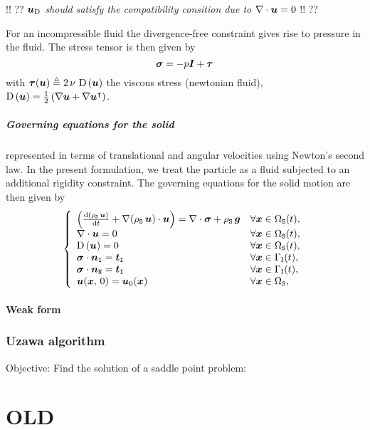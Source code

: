 \documentclass[10pt,a4paper]{article}
\begin{document}
!! ?? \emph{$\boldsymbol{u}_{\mathrm{D}}$ should satisfy the compatibility consition due to $\nabla\cdot \boldsymbol{u} =0$} !! ??

For an incompressible fluid the divergence-free constraint gives rise to pressure in the fluid. The stress tensor is then given by
 \begin{equation}
 \label{eq:stress_tensor}
 \boldsymbol{\sigma} = -p\boldsymbol{I} + \boldsymbol{\tau}
 \end{equation}
%
with $\boldsymbol{\tau}(\boldsymbol{u}) \triangleq 2\,\nu\, \operatorname{D}\left( \boldsymbol{u}\right)$ the viscous stress (newtonian fluid), $\operatorname{D}\left( \boldsymbol{u}\right) = \frac{1}{2}\left(\nabla \boldsymbol{u} + \nabla \boldsymbol{u} ^\intercal \right)$.

\subsubsection{Governing equations for the solid}
%
represented in terms of translational and angular velocities using
Newton's second law. In the present formulation, we treat the particle as a fluid subjected to an additional rigidity constraint. The governing equations for the solid motion are then given
by
%
\begin{equation}
\left\{
\begin{array}{ll}
\left(\frac{\mathrm{d} (\rho_{\mathtt{S}}\, \boldsymbol{u})}{\mathrm{d} t} + \nabla(\rho_{\mathtt{S}}\, \boldsymbol{u})\cdot \boldsymbol{u}\right)= \nabla\cdot \boldsymbol{\sigma} + \rho_{\mathtt{S}}\, \boldsymbol{g} & \forall \boldsymbol{x} \in \Omega_{\mathtt{S}}(t), \\
\nabla\cdot \boldsymbol{u} = 0 & \forall \boldsymbol{x} \in \Omega_{\mathtt{S}}(t), \\
\operatorname{D}\left( \boldsymbol{u}\right) = 0 & \forall \boldsymbol{x} \in \Omega_{\mathtt{S}}(t), \\
\boldsymbol{\sigma}\cdot \boldsymbol{n}_{{\mathtt{I}}} = \boldsymbol{t}_{\mathtt{I}} & \forall \boldsymbol{x} \in \Gamma_{\mathrm{I}}(t), \\
\boldsymbol{\sigma}\cdot \boldsymbol{n}_{{\mathtt{N}}} = \boldsymbol{t}_{\mathtt{I}} & \forall \boldsymbol{x} \in \Gamma_{\mathrm{I}}(t), \\
\boldsymbol{u}(\boldsymbol{x}, \,0) = \boldsymbol{u}_{\mathrm{0}}(\boldsymbol{x}) & \forall \boldsymbol{x} \in \Omega_{\mathtt{S}}, 
\end{array}
\right.
\end{equation}
%
\subsection{Weak form}
%

%
\section{Uzawa algorithm}
%
Objective: Find the solution of a saddle point problem:
%

%
\part{OLD}
%
%
%
\end{document}

